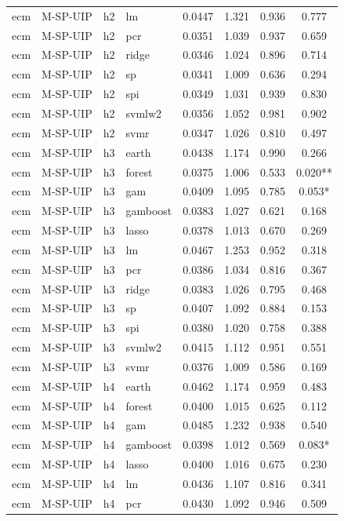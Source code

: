 \begin{ThreePartTable}
\begin{longtable}[t]{llclcccc}
ecm & M-SP-UIP & h2 & lm & 0.0447 & 1.321 & 0.936 & 0.777\\
ecm & M-SP-UIP & h2 & pcr & 0.0351 & 1.039 & 0.937 & 0.659\\
ecm & M-SP-UIP & h2 & ridge & 0.0346 & 1.024 & 0.896 & 0.714\\
ecm & M-SP-UIP & h2 & sp & 0.0341 & 1.009 & 0.636 & 0.294\\
ecm & M-SP-UIP & h2 & spi & 0.0349 & 1.031 & 0.939 & 0.830\\
ecm & M-SP-UIP & h2 & svmlw2 & 0.0356 & 1.052 & 0.981 & 0.902\\
ecm & M-SP-UIP & h2 & svmr & 0.0347 & 1.026 & 0.810 & 0.497\\
\addlinespace
ecm & M-SP-UIP & h3 & earth & 0.0438 & 1.174 & 0.990 & 0.266\\
ecm & M-SP-UIP & h3 & forest & 0.0375 & 1.006 & 0.533 & 0.020**\\
ecm & M-SP-UIP & h3 & gam & 0.0409 & 1.095 & 0.785 & 0.053*\\
ecm & M-SP-UIP & h3 & gamboost & 0.0383 & 1.027 & 0.621 & 0.168\\
ecm & M-SP-UIP & h3 & lasso & 0.0378 & 1.013 & 0.670 & 0.269\\
ecm & M-SP-UIP & h3 & lm & 0.0467 & 1.253 & 0.952 & 0.318\\
ecm & M-SP-UIP & h3 & pcr & 0.0386 & 1.034 & 0.816 & 0.367\\
ecm & M-SP-UIP & h3 & ridge & 0.0383 & 1.026 & 0.795 & 0.468\\
ecm & M-SP-UIP & h3 & sp & 0.0407 & 1.092 & 0.884 & 0.153\\
ecm & M-SP-UIP & h3 & spi & 0.0380 & 1.020 & 0.758 & 0.388\\
ecm & M-SP-UIP & h3 & svmlw2 & 0.0415 & 1.112 & 0.951 & 0.551\\
ecm & M-SP-UIP & h3 & svmr & 0.0376 & 1.009 & 0.586 & 0.169\\
\addlinespace
ecm & M-SP-UIP & h4 & earth & 0.0462 & 1.174 & 0.959 & 0.483\\
ecm & M-SP-UIP & h4 & forest & 0.0400 & 1.015 & 0.625 & 0.112\\
ecm & M-SP-UIP & h4 & gam & 0.0485 & 1.232 & 0.938 & 0.540\\
ecm & M-SP-UIP & h4 & gamboost & 0.0398 & 1.012 & 0.569 & 0.083*\\
ecm & M-SP-UIP & h4 & lasso & 0.0400 & 1.016 & 0.675 & 0.230\\
ecm & M-SP-UIP & h4 & lm & 0.0436 & 1.107 & 0.816 & 0.341\\
ecm & M-SP-UIP & h4 & pcr & 0.0430 & 1.092 & 0.946 & 0.509\\

\end{longtable}
\end{ThreePartTable}

